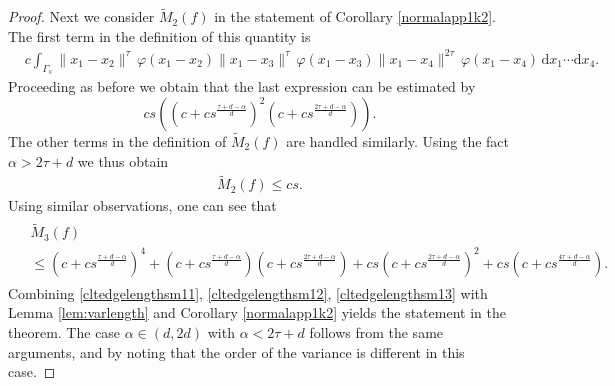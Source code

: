 \documentclass{article}
\theoremstyle{definition}
\numberwithin{equation}{section}
\theoremstyle{remark}
\begin{document}
\begin{proof}
Next we consider $\widetilde{M}_2(f)$ in the statement of Corollary \ref{normalapp1k2}. The first term in the definition of this quantity is
\begin{align*}
    & c \int_{\Gamma_s}  \|x_1-x_2\|^{\tau}\,\varphi(x_1-x_2)  \|x_1-x_3\|^{\tau}\,\varphi(x_1-x_3) \|x_1-x_4\|^{2\tau}\,\varphi(x_1-x_4) \,\mathrm{d}x_1\cdots \mathrm{d}x_4 .
\end{align*}
Proceeding as before we obtain that the last expression can be estimated by
$$ c s \left( (c + c s^{\frac{\tau + d -\alpha}{d}})^2 (c + c s^{\frac{2\tau + d -\alpha}{d}}) \right) .$$
The other terms in the definition of $\widetilde{M}_2(f)$ are handled similarly. Using the fact $\alpha>2\tau+d$ we thus obtain
\begin{align} \label{cltedgelengthsm12}
\widetilde{M}_2(f) \leq  c s .
\end{align}
Using similar observations, one can see that
\begin{align} \label{cltedgelengthsm13}
\begin{split}
& \widetilde{M}_3(f) \\
&\leq (c + c s^{\frac{\tau + d -\alpha}{d}})^4 + (c + c s^{\frac{\tau + d -\alpha}{d}}) (c+cs^{\frac{2\tau + d -\alpha}{d}}) + c s (c + c s^{\frac{2\tau + d -\alpha}{d}})^2 + c s (c + c s^{\frac{4\tau + d -\alpha}{d}}).
\end{split}
\end{align}
Combining \eqref{cltedgelengthsm11}, \eqref{cltedgelengthsm12}, \eqref{cltedgelengthsm13} with Lemma \ref{lem:varlength} and Corollary \ref{normalapp1k2} yields the statement in the theorem. The case $\alpha\in (d,2d)$ with $\alpha < 2\tau +d$ follows from the same arguments, and by noting that the order of the variance is different in this case.
\end{proof}
\end{document}
